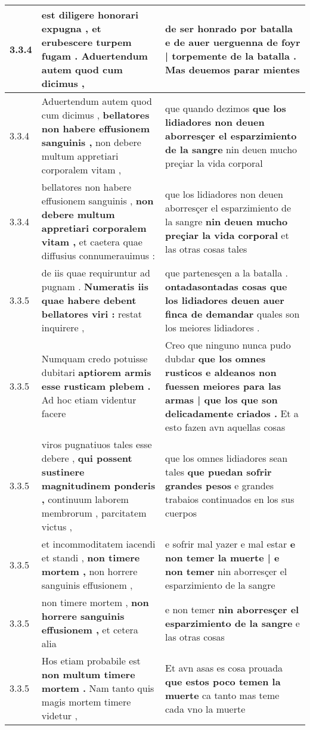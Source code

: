\begin{tabular}{|p{1cm}|p{6.5cm}|p{6.5cm}|}
3.3.4 & est diligere honorari expugna , \textbf{ et erubescere turpem fugam . } Aduertendum autem quod cum dicimus , & de ser honrado por batalla \textbf{ e de auer uerguenna de foyr | torpemente de la batalla . } Mas deuemos parar mientes \\\hline
3.3.4 & Aduertendum autem quod cum dicimus , \textbf{ bellatores non habere effusionem sanguinis , } non debere multum appretiari corporalem vitam , & que quando dezimos \textbf{ que los lidiadores non deuen aborresçer el esparzimiento de la sangre } nin deuen mucho preçiar la vida corporal \\\hline
3.3.4 & bellatores non habere effusionem sanguinis , \textbf{ non debere multum appretiari corporalem vitam , } et caetera quae diffusius connumerauimus : & que los lidiadores non deuen aborresçer el esparzimiento de la sangre \textbf{ nin deuen mucho preçiar la vida corporal } et las otras cosas tales \\\hline
3.3.5 & de iis quae requiruntur ad pugnam . \textbf{ Numeratis iis quae habere debent bellatores viri : } restat inquirere , & que partenesçen a la batalla . \textbf{ ontadasontadas cosas que los lidiadores deuen auer finca de demandar } quales son los meiores lidiadores . \\\hline
3.3.5 & Numquam credo potuisse dubitari \textbf{ aptiorem armis esse rusticam plebem . } Ad hoc etiam videntur facere & Creo que ninguno nunca pudo dubdar \textbf{ que los omnes rusticos e aldeanos non fuessen meiores para las armas | que los que son delicadamente criados . } Et a esto fazen avn aquellas cosas \\\hline
3.3.5 & viros pugnatiuos tales esse debere , \textbf{ qui possent sustinere magnitudinem ponderis , } continuum laborem membrorum , parcitatem victus , & que los omnes lidiadores sean tales \textbf{ que puedan sofrir grandes pesos } e grandes trabaios continuados en los sus cuerpos \\\hline
3.3.5 & et incommoditatem iacendi et standi , \textbf{ non timere mortem , } non horrere sanguinis effusionem , & e sofrir mal yazer e mal estar \textbf{ e non temer la muerte | e non temer } nin aborresçer el esparzimiento de la sangre \\\hline
3.3.5 & non timere mortem , \textbf{ non horrere sanguinis effusionem , } et cetera alia & e non temer \textbf{ nin aborresçer el esparzimiento de la sangre } e las otras cosas \\\hline
3.3.5 & Hos etiam probabile est \textbf{ non multum timere mortem . } Nam tanto quis magis mortem timere videtur , & Et avn asas es cosa prouada \textbf{ que estos poco temen la muerte } ca tanto mas teme cada vno la muerte \\\hline

\end{tabular}
